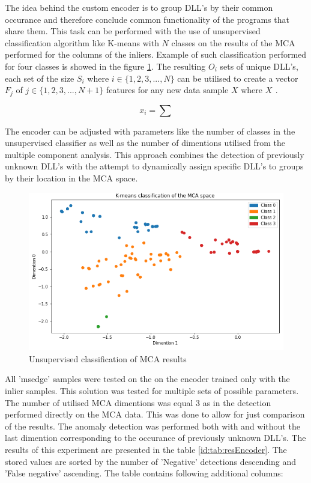 \documentclass[a4paper,twoside,12pt]{book}
\begin{document}
The idea behind the custom encoder is to group DLL's by their common occurance and therefore
conclude common functionality of the programs that share them. This task can be performed
with the use of unsupervised classification algorithm like K-means with $\mathit{N}$ classes 
on the results of the MCA performed for the columns of the inliers. Example of such classification
performed for four classes is showed in the figure \ref{fig:kmeanmca}. The resulting 
$\mathit{O_{i}}$ sets of unique DLL's, each set of the size $\mathit{S_{i}}$  where 
$\mathit{i\in\{1, 2, 3,..., N\}}$  can be utilised to create a 
vector $\mathit{F_{j}}$ of $\mathit{j\in\{1, 2, 3, ..., N + 1\}}$ features for any new 
data sample $\mathit{X}$ where $\mathit{X_{}}$ . 

\begin{equation} \label{eu_eqn}
	x_{i} = 
	\sum 
\end{equation}

The encoder can be adjusted with parameters like the number of classes in the unsupervised 
classifier as well as the number of dimentions utilised from the multiple component analysis. 
This approach combines the detection of previously unknown DLL's with the attempt to dynamically
 assign specific DLL's to groups by their location in the MCA space. 


 \begin{figure}
	\centering
	\includegraphics[scale=0.9]{images/KmeanMCA}
	\caption{Unsupervised classification of MCA results}
	\label{fig:kmeanmca}
 \end{figure}

All 'msedge' samples were tested on the on the encoder trained only with the inlier samples.
This solution was tested for multiple sets of possible parameters. The number of utilised MCA 
dimentions was equal 3 as in the detection performed directly on the MCA data. This was done to 
allow for just comparison of the results. The anomaly detection was performed
both with and without the last dimention corresponding to the occurance of previously unknown DLL's.
The results of this experiment are presented in the table \ref{id:tab:resEncoder}. The stored values 
are sorted by the number of 'Negative' detections descending and 'False negative' ascending. The 
table contains following additional columns:
\end{document}
